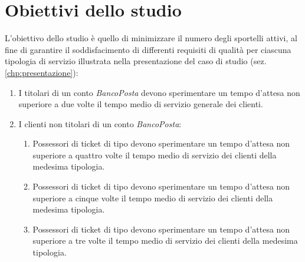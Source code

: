\chapter{Obiettivi dello studio}\label{chp:obiettivi}
L'obiettivo dello studio è quello di minimizzare il numero degli sportelli attivi, al fine di garantire il soddisfacimento di differenti requisiti di qualità per ciascuna tipologia di servizio illustrata nella presentazione del caso di studio (sez. \ref{chp:presentazione}):

\begin{enumerate}[label=QoS-\arabic*), align=left, leftmargin=*]
\item I titolari di un conto \textsl{BancoPosta} devono sperimentare un tempo d'attesa non superiore a due volte il tempo medio di servizio generale dei clienti.
\item I clienti non titolari di un conto \textsl{BancoPosta}:
\begin{enumerate}
\item Possessori di ticket di tipo \uo{} devono sperimentare un tempo d'attesa non superiore a quattro volte il tempo medio di servizio dei clienti della medesima tipologia.
\item Possessori di ticket di tipo \pp{} devono sperimentare un tempo d'attesa non superiore a cinque volte il tempo medio di servizio dei clienti della medesima tipologia.
\item Possessori di ticket di tipo \sr{} devono sperimentare un tempo d'attesa non superiore a tre volte il tempo medio di servizio dei clienti della medesima tipologia.
\end{enumerate}
\end{enumerate}
